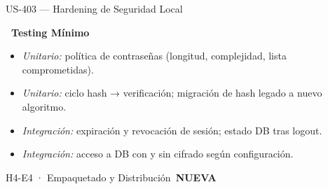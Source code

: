 \documentclass[11pt,a4paper]{article}
\newcommand{\usfield}[2][\;]{%
  \par\vspace{5pt}%
  {\small\textbf{\textcolor{primary}{#2}}}\par\vspace{2pt}%
}
\newcommand{\tagnew}{\,\colorbox{tagnew}{\tiny\bfseries NUEVA}\,}
\begin{document}
\begin{uscard}{US-403 — Hardening de Seguridad Local}
\usfield{\faFlask\ Testing Mínimo}
\begin{itemize}[nosep, leftmargin=1.6em]
  \item \textit{Unitario:} política de contraseñas (longitud, complejidad, lista comprometidas).
  \item \textit{Unitario:} ciclo hash → verificación; migración de hash legado a nuevo algoritmo.
  \item \textit{Integración:} expiración y revocación de sesión; estado DB tras logout.
  \item \textit{Integración:} acceso a DB con y sin cifrado según configuración.
\end{itemize}

\end{uscard}

\begin{epicbox}{H4-E4 · Empaquetado y Distribución \tagnew}
\end{epicbox}
\end{document}
